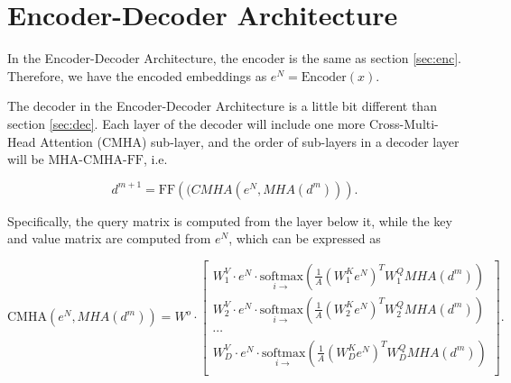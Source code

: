 \section{Encoder-Decoder Architecture}

In the Encoder-Decoder Architecture, the encoder is the same as section \ref{sec:enc}. Therefore, we have the encoded embeddings as $e^N = \mathrm{Encoder}(x)$.

The decoder in the Encoder-Decoder Architecture is a little bit different than section \ref{sec:dec}. Each layer of the decoder will include one more Cross-Multi-Head Attention (CMHA) sub-layer, and the order of sub-layers in a decoder layer will be $\mathrm{MHA}$-$\mathrm{CMHA}$-$\mathrm{FF}$, i.e.

\begin{equation}
    d^{m+1} = \mathrm{FF}(\mathrm(CMHA(e^N, MHA(d^m))).
\end{equation}

Specifically, the query matrix is computed from the layer below it, while the key and value matrix are computed from $e^N$, which can be expressed as

\begin{equation}
    \mathrm{CMHA}(e^N, MHA(d^m)) = W^o \cdot
\begin{bmatrix}
    W^V_1 \cdot e^N \cdot \underset{i \rightarrow}{\mathrm{softmax}}\left( \frac{1}{A} \left(W^K_1 e^N\right)^T W^Q_1 MHA(d^m) \right)\\
    W^V_2 \cdot e^N \cdot \underset{i \rightarrow}{\mathrm{softmax}}\left( \frac{1}{A} \left(W^K_2 e^N\right)^T W^Q_2 MHA(d^m) \right)\\
    \cdots\\
    W^V_D \cdot e^N \cdot \underset{i \rightarrow}{\mathrm{softmax}}\left( \frac{1}{A} \left(W^K_D e^N\right)^T W^Q_D MHA(d^m) \right)\\
\end{bmatrix}\nonumber.
\end{equation}

